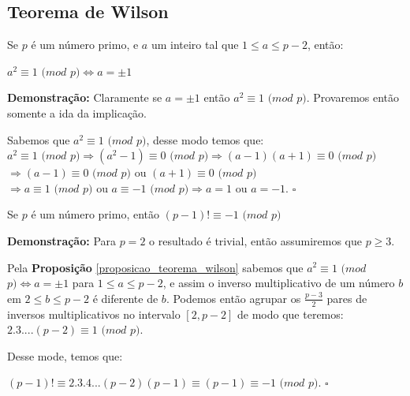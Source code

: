 \subsection{Teorema de Wilson}

\begin{proposition}\label{proposicao_teorema_wilson}
Se $p$ é um número primo, e $a$ um inteiro tal que $1\leq a\leq p-2$, então:

$a^2 \equiv 1$ $(mod$ $p) \Leftrightarrow a = \pm 1 $
\end{proposition}
\textbf{Demonstração:}
Claramente se $a = \pm 1$ então $a^2 \equiv 1$ $(mod$ $p)$. Provaremos então somente a ida da implicação.

Sabemos que $a^2 \equiv 1$ $(mod$ $p)$, desse modo temos que:
\\

$a^2 \equiv 1$ $(mod$ $p) \Rightarrow (a^2-1) \equiv 0$ $(mod$ $p) \Rightarrow (a-1)(a+1) \equiv 0$ $(mod$ $p)$
\\
$\Rightarrow (a-1)\equiv0$ $(mod$ $p)$ ou $(a+1)\equiv0$ $(mod$ $p)$
\\
$\Rightarrow a\equiv1$ $(mod$ $p)$ ou $a\equiv-1$ $(mod$ $p) \Rightarrow a=1$ ou $a=-1$. $\square$

\begin{theorem}
Se $p$ é um número primo, então $(p-1)! \equiv -1$ $(mod$ $p)$
\end{theorem}
\textbf{Demonstração:}
Para $p=2$ o resultado é trivial, então assumiremos que $p\geq 3$.

Pela \textbf{Proposição} \autoref{proposicao_teorema_wilson} sabemos que $a^2 \equiv 1$ $(mod$ $p) \Leftrightarrow a = \pm 1$ 
para $1\leq a\leq p-2$, e assim o inverso multiplicativo de um número $b$ em $2\leq b\leq p-2$ é diferente de $b$. Podemos então
agrupar os $\frac{p-3}{2}$ pares de inversos multiplicativos no intervalo $[2,p-2]$ de modo que teremos: $2.3....(p-2) \equiv1$ $(mod$ $p)$.

Desse mode, temos que:

$(p-1)! \equiv 2.3.4...(p-2)(p-1) \equiv (p-1) \equiv -1$ $(mod$ $p)$. $\square$



